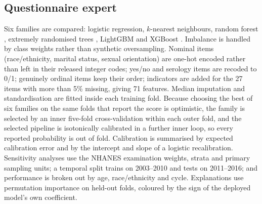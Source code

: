 \documentclass[lettersize,journal]{IEEEtran}
\begin{document}
\subsection{Questionnaire expert}
\label{sec:tabular}
Six families are compared: logistic regression, $k$-nearest neighbours, random forest \cite{breiman2001random}, extremely randomised trees \cite{geurts2006extremely}, LightGBM \cite{ke2017lightgbm} and XGBoost \cite{chen2016xgboost}. Imbalance is handled by class weights rather than synthetic oversampling. Nominal items (race/ethnicity, marital status, sexual orientation) are one-hot encoded rather than left in their released integer codes; yes/no and serology items are recoded to 0/1; genuinely ordinal items keep their order; indicators are added for the 27 items with more than 5\% missing, giving 71 features. Median imputation and standardisation are fitted inside each training fold. Because choosing the best of six families on the same folds that report the score is optimistic, the family is selected by an inner five-fold cross-validation within each outer fold, and the selected pipeline is isotonically calibrated \cite{zadrozny2002transforming} in a further inner loop, so every reported probability is out of fold. Calibration is summarised by expected calibration error and by the intercept and slope of a logistic recalibration. Sensitivity analyses use the NHANES examination weights, strata and primary sampling units; a temporal split trains on 2003--2010 and tests on 2011--2016; and performance is broken out by age, race/ethnicity and cycle. Explanations use permutation importance on held-out folds, coloured by the sign of the deployed model's own coefficient.
\end{document}
